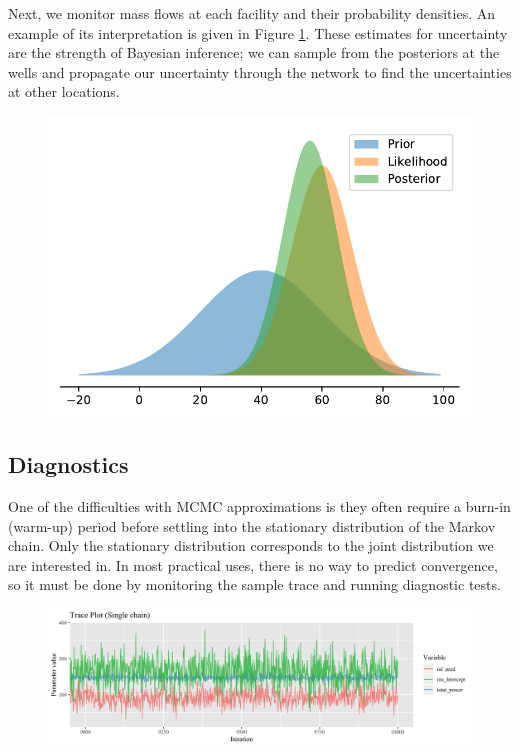 \documentclass[a4paper, 12pt]{article}
\begin{document}
Next, we monitor mass flows at each facility and their probability densities. An example of its interpretation is given in Figure \ref{fig:bayesdemo}. These estimates for uncertainty are the strength of Bayesian inference; we can sample from the posteriors at the wells and propagate our uncertainty through the network to find the uncertainties at other locations.

\begin{figure}
\centering
  \includegraphics[width=0.5\linewidth]{media/bayesdemo}
  \label{fig:bayesdemo}
\end{figure}

\subsection{Diagnostics}
One of the difficulties with MCMC approximations is they often require a burn-in (warm-up) period before settling into the stationary distribution of the Markov chain. Only the stationary distribution corresponds to the joint distribution we are interested in. In most practical uses, there is no way to predict convergence, so it must be done by monitoring the sample trace and running diagnostic tests.

\begin{figure}
\centering
  \includegraphics[width=\linewidth]{media/trace_plot}
  \label{fig:trace_plot}
\end{figure}
\end{document}
